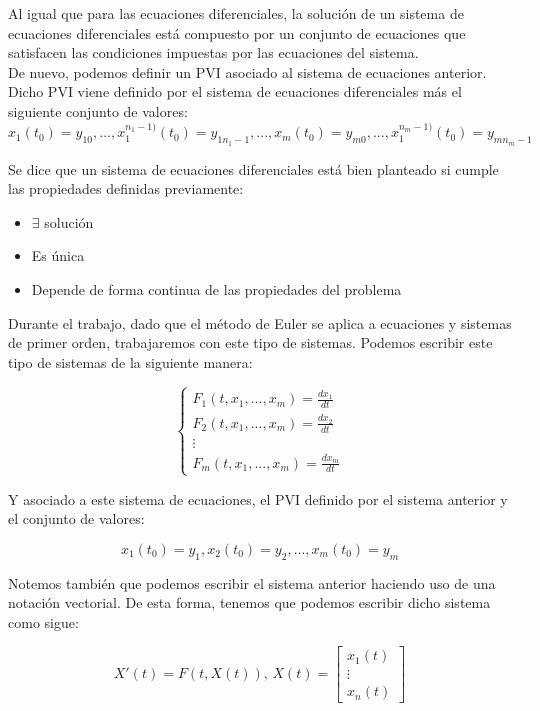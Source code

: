 \documentclass[12pt]{article}       %
\begin{document}
Al igual que para las ecuaciones diferenciales, la solución de un sistema de ecuaciones diferenciales está compuesto por un conjunto de ecuaciones que satisfacen las condiciones impuestas por las ecuaciones del sistema.\\

De nuevo, podemos definir un PVI asociado al sistema de ecuaciones anterior. Dicho PVI viene definido por el sistema de ecuaciones diferenciales más el siguiente conjunto de valores:
$$ x_1(t_0) = y_{10}, ..., x_1^{n_1-1)}(t_0) = y_{1n_1-1}, ..., x_m(t_0) = y_{m0}, ..., x_1^{n_m-1)}(t_0) = y_{mn_m-1} $$

Se dice que un sistema de ecuaciones diferenciales está bien planteado si cumple las propiedades definidas previamente:

\begin{itemize}
\item $\exists$ solución
\item Es única
\item Depende de forma continua de las propiedades del problema
\end{itemize}

Durante el trabajo, dado que el método de Euler se aplica a ecuaciones y sistemas de primer orden, trabajaremos con este tipo de sistemas. Podemos escribir este tipo de sistemas de la siguiente manera:

$$
\begin{cases}
F_1(t, x_1, ..., x_m) = \frac{d x_1}{d t} \\
F_2(t, x_1, ..., x_m) = \frac{d x_2}{d t} \\
\vdots \\
F_m(t, x_1, ..., x_m) = \frac{d x_m}{d t}
\end{cases}
$$

Y asociado a este sistema de ecuaciones, el PVI definido por el sistema anterior y el conjunto de valores:

$$ x_1(t_0) = y_1, x_2(t_0) = y_2, ..., x_m(t_0) = y_m $$

Notemos también que podemos escribir el sistema anterior haciendo uso de una notación vectorial. De esta forma, tenemos que podemos escribir dicho sistema como sigue:

$$
X'(t)=F(t,X(t)), \, 
X(t)=\begin{bmatrix}
    x_1(t) \\
    \vdots \\
    x_n(t)
    \end{bmatrix}
$$
\end{document}
